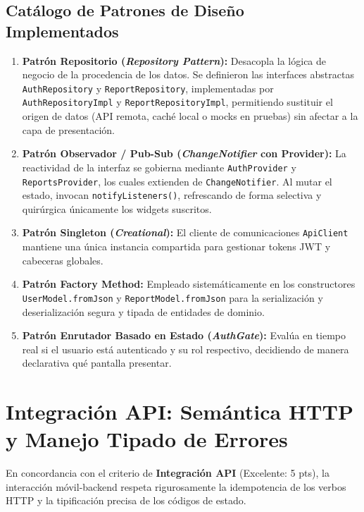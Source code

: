 \documentclass[12pt,a4paper]{article}
\begin{document}
\subsection{Catálogo de Patrones de Diseño Implementados}
\begin{enumerate}[leftmargin=*]
    \item \textbf{Patrón Repositorio (\textit{Repository Pattern}):} Desacopla la lógica de negocio de la procedencia de los datos. Se definieron las interfaces abstractas \texttt{AuthRepository} y \texttt{ReportRepository}, implementadas por \texttt{AuthRepositoryImpl} y \texttt{ReportRepositoryImpl}, permitiendo sustituir el origen de datos (API remota, caché local o mocks en pruebas) sin afectar a la capa de presentación.
    \item \textbf{Patrón Observador / Pub-Sub (\textit{ChangeNotifier} con Provider):} La reactividad de la interfaz se gobierna mediante \texttt{AuthProvider} y \texttt{ReportsProvider}, los cuales extienden de \texttt{ChangeNotifier}. Al mutar el estado, invocan \texttt{notifyListeners()}, refrescando de forma selectiva y quirúrgica únicamente los widgets suscritos.
    \item \textbf{Patrón Singleton (\textit{Creational}):} El cliente de comunicaciones \texttt{ApiClient} mantiene una única instancia compartida para gestionar tokens JWT y cabeceras globales.
    \item \textbf{Patrón Factory Method:} Empleado sistemáticamente en los constructores \texttt{UserModel.fromJson} y \texttt{ReportModel.fromJson} para la serialización y deserialización segura y tipada de entidades de dominio.
    \item \textbf{Patrón Enrutador Basado en Estado (\textit{AuthGate}):} Evalúa en tiempo real si el usuario está autenticado y su rol respectivo, decidiendo de manera declarativa qué pantalla presentar.
\end{enumerate}

\section{Integración API: Semántica HTTP y Manejo Tipado de Errores}

En concordancia con el criterio de \textbf{Integración API} (Excelente: 5 pts), la interacción móvil-backend respeta rigurosamente la idempotencia de los verbos HTTP y la tipificación precisa de los códigos de estado.
\end{document}
